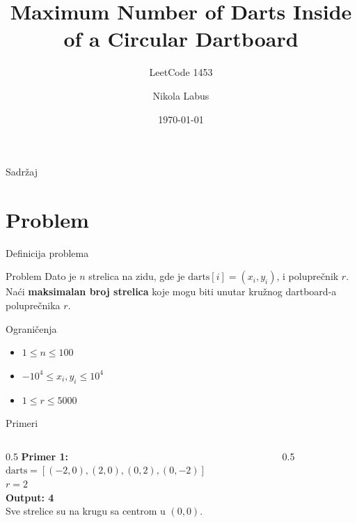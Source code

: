 \documentclass{beamer}
\title{Maximum Number of Darts Inside of a Circular Dartboard}
\subtitle{LeetCode 1453}
\author{Nikola Labus}
\date{\today}
\begin{document}
\begin{frame}
\titlepage
\end{frame}

\begin{frame}{Sadržaj}
\tableofcontents
\end{frame}

\section{Problem}

\begin{frame}{Definicija problema}
\begin{block}{Problem}
Dato je $n$ strelica na zidu, gde je $\text{darts}[i] = (x_i, y_i)$, i poluprečnik $r$.\\[6pt]
Naći \textbf{maksimalan broj strelica} koje mogu biti unutar kružnog dartboard-a poluprečnika $r$.
\end{block}

\vspace{10pt}

\begin{block}{Ograničenja}
\begin{itemize}
    \item $1 \leq n \leq 100$
    \item $-10^4 \leq x_i, y_i \leq 10^4$
    \item $1 \leq r \leq 5000$
\end{itemize}
\end{block}
\end{frame}

\begin{frame}{Primeri}
\begin{columns}
\begin{column}{0.5\textwidth}
\textbf{Primer 1:}\\[4pt]
$\text{darts} = [(-2,0),(2,0),(0,2),(0,-2)]$\\
$r = 2$\\[4pt]
\textbf{Output: 4}\\[4pt]
Sve strelice su na krugu sa centrom u $(0,0)$.
\end{column}

\begin{column}{0.5\textwidth}
\begin{center}
\end{center}
\end{column}
\end{columns}
\end{frame}
\end{document}
